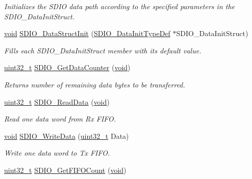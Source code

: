 \begin{DoxyCompactItemize}
\begin{DoxyCompactList}\small\item\em Initializes the S\+D\+IO data path according to the specified parameters in the S\+D\+I\+O\+\_\+\+Data\+Init\+Struct. \end{DoxyCompactList}\item 
\hyperlink{usb__devapi_8h_afabf60e7f57651d6d595a02c75f07cd0}{void} \hyperlink{group___s_d_i_o___private___functions_gaa83209c09e921521aca2587fb5b22ea2}{S\+D\+I\+O\+\_\+\+Data\+Struct\+Init} (\hyperlink{struct_s_d_i_o___data_init_type_def}{S\+D\+I\+O\+\_\+\+Data\+Init\+Type\+Def} $\ast$S\+D\+I\+O\+\_\+\+Data\+Init\+Struct)
\begin{DoxyCompactList}\small\item\em Fills each S\+D\+I\+O\+\_\+\+Data\+Init\+Struct member with its default value. \end{DoxyCompactList}\item 
\hyperlink{_p_e___types_8h_a33594304e786b158f3fb30289278f5af}{uint32\+\_\+t} \hyperlink{group___s_d_i_o___private___functions_ga7a28aaa2c25a9a5a8db1f49b0e8c9d0a}{S\+D\+I\+O\+\_\+\+Get\+Data\+Counter} (\hyperlink{usb__devapi_8h_afabf60e7f57651d6d595a02c75f07cd0}{void})
\begin{DoxyCompactList}\small\item\em Returns number of remaining data bytes to be transferred. \end{DoxyCompactList}\item 
\hyperlink{_p_e___types_8h_a33594304e786b158f3fb30289278f5af}{uint32\+\_\+t} \hyperlink{group___s_d_i_o___private___functions_ga4e8ac755ef3c31ecd4ed2708df19187e}{S\+D\+I\+O\+\_\+\+Read\+Data} (\hyperlink{usb__devapi_8h_afabf60e7f57651d6d595a02c75f07cd0}{void})
\begin{DoxyCompactList}\small\item\em Read one data word from Rx F\+I\+FO. \end{DoxyCompactList}\item 
\hyperlink{usb__devapi_8h_afabf60e7f57651d6d595a02c75f07cd0}{void} \hyperlink{group___s_d_i_o___private___functions_ga361008b5252aa33b5f2b5823ee3d7240}{S\+D\+I\+O\+\_\+\+Write\+Data} (\hyperlink{_p_e___types_8h_a33594304e786b158f3fb30289278f5af}{uint32\+\_\+t} Data)
\begin{DoxyCompactList}\small\item\em Write one data word to Tx F\+I\+FO. \end{DoxyCompactList}\item 
\hyperlink{_p_e___types_8h_a33594304e786b158f3fb30289278f5af}{uint32\+\_\+t} \hyperlink{group___s_d_i_o___private___functions_ga9a3343983a2d68b5164a1c89797d2dd6}{S\+D\+I\+O\+\_\+\+Get\+F\+I\+F\+O\+Count} (\hyperlink{usb__devapi_8h_afabf60e7f57651d6d595a02c75f07cd0}{void})

\end{DoxyCompactItemize}
